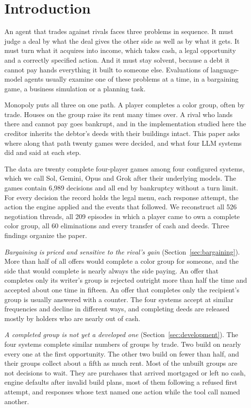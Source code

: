 \section{Introduction}
\label{sec:intro}

An agent that trades against rivals faces three problems in sequence. It must judge a deal by what the deal gives the other side as well as by what it gets. It must turn what it acquires into income, which takes cash, a legal opportunity and a correctly specified action. And it must stay solvent, because a debt it cannot pay hands everything it built to someone else. Evaluations of language-model agents usually examine one of these problems at a time, in a bargaining game, a business simulation or a planning task.

Monopoly puts all three on one path. A player completes a color group, often by trade. Houses on the group raise its rent many times over. A rival who lands there and cannot pay goes bankrupt, and in the implementation studied here the creditor inherits the debtor's deeds with their buildings intact. This paper asks where along that path twenty games were decided, and what four LLM systems did and said at each step.

The data are twenty complete four-player games among four configured systems, which we call Sol, Gemini, Opus and Grok after their underlying models. The games contain 6,989 decisions and all end by bankruptcy without a turn limit. For every decision the record holds the legal menu, each response attempt, the action the engine applied and the events that followed. We reconstruct all 526 negotiation threads, all 209 episodes in which a player came to own a complete color group, all 60 eliminations and every transfer of cash and deeds. Three findings organize the paper.

\emph{Bargaining is priced and sensitive to the rival's gain} (Section~\ref{sec:bargaining}). More than half of all offers would complete a color group for someone, and the side that would complete is nearly always the side paying. An offer that completes only its writer's group is rejected outright more than half the time and accepted about one time in fifteen. An offer that completes only the recipient's group is usually answered with a counter. The four systems accept at similar frequencies and decline in different ways, and completing deeds are released mostly by holders who are nearly out of cash.

\emph{A completed group is not yet a developed one} (Section~\ref{sec:development}). The four systems complete similar numbers of groups by trade. Two build on nearly every one at the first opportunity. The other two build on fewer than half, and their groups collect about a fifth as much rent. Most of the unbuilt groups are not decisions to wait. They are purchases that arrived mortgaged or left no cash, engine defaults after invalid build plans, most of them following a refused first attempt, and responses whose text named one action while the tool call named another.

